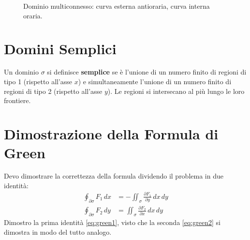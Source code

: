 \begin{figure}[H]
    \centering
    \caption{Dominio multiconnesso: curva esterna antioraria, curva interna oraria.}
\end{figure}

\section{Domini Semplici}

Un dominio $\sigma$ si definisce \textbf{semplice} se è l'unione di un numero finito di regioni di tipo 1 (rispetto all'asse $x$) e simultaneamente l'unione di un numero finito di regioni di tipo 2 (rispetto all'asse $y$). Le regioni si intersecano al più lungo le loro frontiere.

\section{Dimostrazione della Formula di Green}
Devo dimostrare la correttezza della formula dividendo il problema in due identità:
\begin{align}
    \oint_{\partial \sigma} F_1 \, dx &= -\iint_{\sigma} \frac{\partial F_1}{\partial y} \, dx \, dy \label{eq:green1} \\
    \oint_{\partial \sigma} F_2 \, dy &= \iint_{\sigma} \frac{\partial F_2}{\partial x} \, dx \, dy \label{eq:green2}
\end{align}
Dimostro la prima identità \eqref{eq:green1}, visto che la seconda \eqref{eq:green2} si dimostra in modo del tutto analogo.

